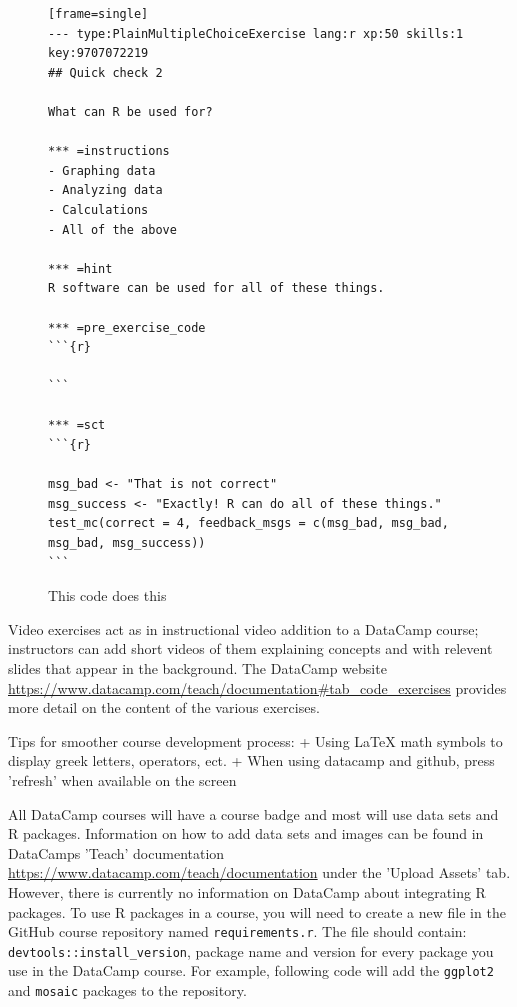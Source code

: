 \documentclass[12pt]{article}
\begin{document}
\begin{figure}
\caption{This code does this}
\begin{verbatim}[frame=single]
--- type:PlainMultipleChoiceExercise lang:r xp:50 skills:1 key:9707072219
## Quick check 2

What can R be used for?

*** =instructions
- Graphing data
- Analyzing data
- Calculations
- All of the above

*** =hint
R software can be used for all of these things.

*** =pre_exercise_code
```{r}

```

*** =sct
```{r}

msg_bad <- "That is not correct"
msg_success <- "Exactly! R can do all of these things."
test_mc(correct = 4, feedback_msgs = c(msg_bad, msg_bad, msg_bad, msg_success))
```
\end{verbatim}
\label{fig:code1}
\end{figure}


Video exercises act as in instructional video addition to a DataCamp course; instructors can add short videos of them explaining concepts and with 
relevent slides that appear in the background. The DataCamp website \url{https://www.datacamp.com/teach/documentation#tab_code_exercises} provides 
more detail on the content of the various exercises. 


Tips for smoother course development process:
    + Using LaTeX math symbols to display greek letters, operators, ect.
    + When using datacamp and github, press 'refresh' when available on the screen

All DataCamp courses will have a course badge and most will use data sets and R packages. Information on how to add data sets and images
can be found in DataCamps 'Teach' documentation \url{https://www.datacamp.com/teach/documentation} under the 'Upload Assets' tab. However,
there is currently no information on DataCamp about integrating R packages. To use R packages in a course, you will need to create a new file
in the GitHub course repository named \texttt{requirements.r}. The file should contain: \texttt{devtools::install\_version}, package name and version for 
every package you use in the DataCamp course. For example, following code will add the \texttt{ggplot2} and \texttt{mosaic} packages to the repository.
\end{document}
